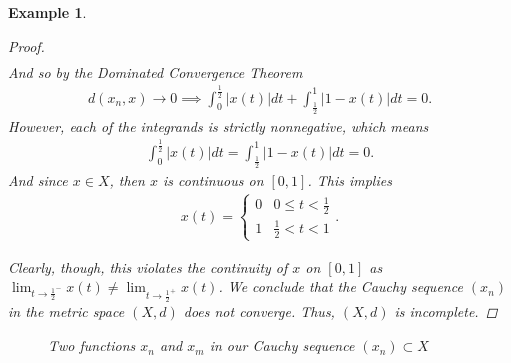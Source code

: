 \documentclass[11pt]{article}
\theoremstyle{mystyle}
\newtheorem{protoexamp}{Example}[section]
\newenvironment{examp}
{\colorlet{shadecolor}{orange!15}\begin{shaded}\begin{protoexamp}}
{\end{protoexamp}\end{shaded}}
\begin{document}
\begin{examp}
\begin{proof}
\begin{align*}
\end{align*}
And so by the Dominated Convergence Theorem
\begin{align*}
    d(x_n, x) \longrightarrow 0 \implies \int_0^{\frac{1}{2}}|x(t)| dt + \int_{\frac{1}{2}}^1|1-x(t)| dt = 0.
\end{align*}
However, each of the integrands is strictly nonnegative, which means
\begin{align*}
    \int_0^{\frac{1}{2}}|x(t)| dt = \int_{\frac{1}{2}}^1|1-x(t)| dt = 0.
\end{align*}
And since $x \in X$, then $x$ is continuous on $[0,1]$. This implies
\begin{align*}
    x(t) = \begin{cases}
    0 & 0 \leq t < \frac{1}{2}\\
    1 & \frac{1}{2}< t < 1
    \end{cases}.
\end{align*}

Clearly, though, this violates the continuity of $x$ on $[0, 1]$ as $\lim_{t \to \frac{1}{2}^-} x(t) \neq \lim_{t \to \frac{1}{2}^+} x(t)$. We conclude that the Cauchy sequence $(x_n)$ in the metric space $(X, d)$ does not converge. Thus, $(X, d)$ is incomplete.
\end{proof}

\begin{figure}[H]
\begin{center}
\end{center}
\caption*{Two functions $x_n$ and $x_m$ in our Cauchy sequence $(x_n) \subset X$}
\end{figure}
\end{examp}
\end{document}
